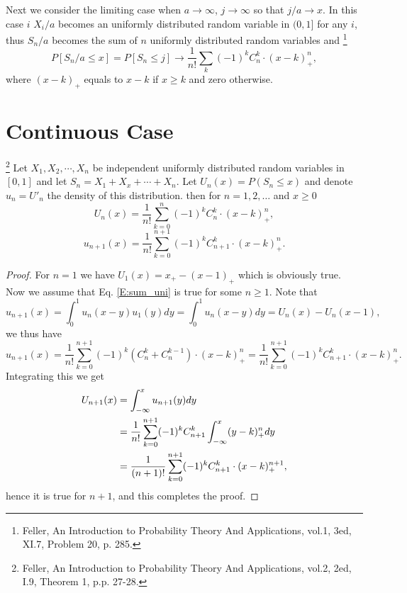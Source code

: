 Next we consider the limiting case when $a\to\infty$, $j\to\infty$ so that 
$j/a\to x$. In this case $i$ $X_i/a$ becomes an uniformly distributed
random variable in $(0,1]$ for any $i$, thus $S_n/a$ becomes the sum of $n$ 
uniformly distributed random variables and
\footnote{Feller, An Introduction to Probability Theory And Applications, 
  vol.1, 3ed, XI.7, Problem 20, p. 285.}
	\begin{equation} \label{E:lim_unif}
	P[S_n/a\le x] = P[S_n\le j] \to \frac{1}{n!} \sum_k (-1)^k C_n^k\cdot (x-k)_+^n,
\end{equation}
where $(x-k)_+$ equals to $x-k$ if $x\ge k$ and zero otherwise.


\section{Continuous Case}
\begin{theorem}
\footnote{Feller, An Introduction to Probability Theory And Applications, 
  vol.2, 2ed, I.9, Theorem 1, p.p. 27-28.}
Let $X_1,X_2,\cdots,X_n$ be independent uniformly distributed random variables 
in $[0,1]$ and let $S_n=X_1+X_x+\cdots +X_n$. Let $U_n(x)=P(S_n\le x)$ and
denote $u_n=U'_n$ the density of this distribution. then for $n=1,2,\dots$ and
$x\ge 0$
\begin{equation} \label{E:sum_uni}
	U_n(x) = \frac{1}{n!} \sum_{k=0}^n (-1)^k C_n^k \cdot (x-k)_+^n,
\end{equation}
\begin{equation}
	u_{n+1}(x) = \frac{1}{n!} \sum_{k=0}^{n+1} (-1)^k C_{n+1}^k \cdot (x-k)_+^n.
\end{equation}
\end{theorem}
\begin{proof}
For $n=1$ we have $U_1(x)=x_+ - (x-1)_+$ which is obviously true. Now we
assume that Eq. \ref{E:sum_uni}  is true for some $n\ge 1$. Note that
\[
	u_{n+1}(x) = \int_0^1 u_n(x-y) u_1(y) dy = \int_0^1 u_n(x-y) dy
	           = U_n(x) - U_n(x-1),
\]
we thus have
\[
	u_{n+1}(x) = \frac{1}{n!} \sum_{k=0}^{n+1} (-1)^k (C_n^k + C_n^{k-1}) 
	             \cdot (x-k)_+^n
					 	= \frac{1}{n!} \sum_{k=0}^{n+1} (-1)^k C_{n+1}^k \cdot (x-k)_+^n.
\]
Integrating this we get
\begin{align*}
	U_{n+1}(x)
	  &=\int_{-\infty}^x u_{n+1}(y) dy    \notag \\
	  &= \frac{1}{n!} \sum_{k=0}^{n+1} (-1)^k C_{n+1}^k 
	      \int_{-\infty}^x (y-k)_+^n dy   \notag \\
	  &= \frac{1}{(n+1)!} \sum_{k=0}^{n+1} (-1)^k C_{n+1}^k \cdot (x-k)_+^{n+1},
				\notag
\end{align*}
hence it is true for $n+1$, and this completes the proof.
\end{proof}

